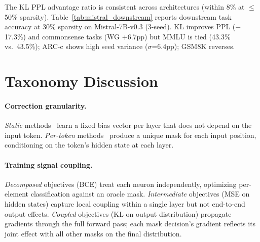 The KL PPL advantage ratio is consistent across architectures (within 8\% at $\leq$50\% sparsity).
Table~\ref{tab:mistral_downstream} reports downstream task accuracy at 30\% sparsity on Mistral-7B-v0.3 (3-seed). KL improves PPL ($-$17.3\%) and commonsense tasks (WG +6.7pp) but MMLU is tied (43.3\% vs.\ 43.5\%); ARC-c shows high seed variance ($\sigma$=6.4pp); GSM8K reverses.

\begin{table}[h]
\centering
\caption{Mistral-7B-v0.3 downstream evaluation at 30\% sparsity. $\pm$: 3-seed mean$\pm$std ($s \in \{42, 123, 456\}$); TEAL is deterministic (single run). ARC-c exhibits high seed variance ($\sigma$=6.4pp).}
\label{tab:mistral_downstream}
\small
{}
\end{table}


\section{Taxonomy Discussion}
\label{app:taxonomy}

\paragraph{Correction granularity.}
\emph{Static} methods~\cite{xu2025spon} learn a fixed bias vector per layer that does not depend on the input token.
\emph{Per-token} methods~\cite{liu2023dejavu,gautam2026fastforward,akhauri2024shadowllm,szatkowski2024d2dmoe} produce a unique mask for each input position, conditioning on the token's hidden state at each layer.

\paragraph{Training signal coupling.}
\emph{Decomposed} objectives (BCE) treat each neuron independently, optimizing per-element classification against an oracle mask.
\emph{Intermediate} objectives (MSE on hidden states) capture local coupling within a single layer but not end-to-end output effects.
\emph{Coupled} objectives (KL on output distribution) propagate gradients through the full forward pass; each mask decision's gradient reflects its joint effect with all other masks on the final distribution.

